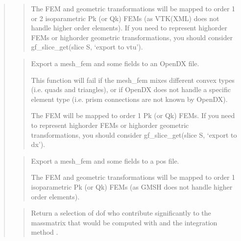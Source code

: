 \documentclass[a4paper,11pt,english]{sphinxmanual}
\begin{document}
\begin{quote}
\begin{quote}
The FEM and geometric transformations will be mapped to order 1
or 2 isoparametric Pk (or Qk) FEMs (as VTK(XML) does not handle higher
order elements). If you need to represent high\sphinxhyphen{}order FEMs or
high\sphinxhyphen{}order geometric transformations, you should consider
gf\_slice\_get(slice S, ‘export to vtu’).
\end{quote}

\begin{quote}

Export a mesh\_fem and some fields to an OpenDX file.

This function will fail if the mesh\_fem mixes different convex types
(i.e. quads and triangles), or if OpenDX does not handle a specific
element type (i.e. prism connections are not known by OpenDX).

The FEM will be mapped to order 1 Pk (or Qk) FEMs. If you need to
represent high\sphinxhyphen{}order FEMs or high\sphinxhyphen{}order geometric transformations,
you should consider gf\_slice\_get(slice S, ‘export to dx’).
\end{quote}

\begin{quote}

Export a mesh\_fem and some fields to a pos file.

The FEM and geometric transformations will be mapped to order 1
isoparametric Pk (or Qk) FEMs (as GMSH does not handle higher
order elements).
\end{quote}

\begin{quote}

Return a selection of dof who contribute significantly to the
mass\sphinxhyphen{}matrix that would be computed with  and the integration
method .


\end{quote}
\end{quote}
\end{document}
